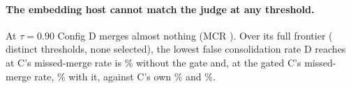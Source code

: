 \paragraph{The embedding host cannot match the judge at any threshold.} At $\tau=0.90$ Config D merges almost nothing (MCR
\VTwoDOffMCR{}). Over its full frontier (\VTwoDFrontNTaus{} distinct thresholds, none selected), the lowest false consolidation
rate D reaches at C's missed-merge rate is \VTwoDFrontCOffOff\% without the gate and, at the gated C's missed-merge rate,
\VTwoDFrontCLexLex\% with it, against C's own \VTwoCOffFCRpct\% and \VTwoCLexFCRpct\%.
